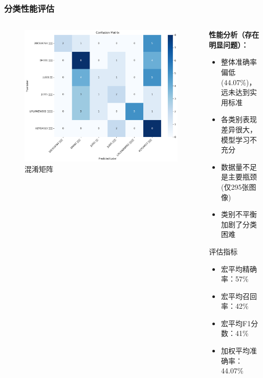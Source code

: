 \documentclass[12pt]{beamer}
\begin{document}
\begin{frame}
\frametitle{分类性能评估}
\begin{columns}
\begin{column}{0.5\textwidth}
\begin{figure}
\centering
\includegraphics[width=\textwidth]{confusion_matrix.png}
\caption{混淆矩阵}
\end{figure}
\end{column}

\begin{column}{0.5\textwidth}
\textbf{性能分析（存在明显问题）：}
\begin{itemize}
    \item 整体准确率偏低(44.07\%)，远未达到实用标准
    \item 各类别表现差异很大，模型学习不充分
    \item 数据量不足是主要瓶颈(仅295张图像)
    \item 类别不平衡加剧了分类困难
\end{itemize}

\vspace{0.3cm}
\begin{block}{评估指标}
\small
\begin{itemize}
    \item 宏平均精确率：57\%
    \item 宏平均召回率：42\%
    \item 宏平均F1分数：41\%
    \item 加权平均准确率：44.07\%
\end{itemize}
\end{block}
\end{column}
\end{columns}
\end{frame}
\end{document}
